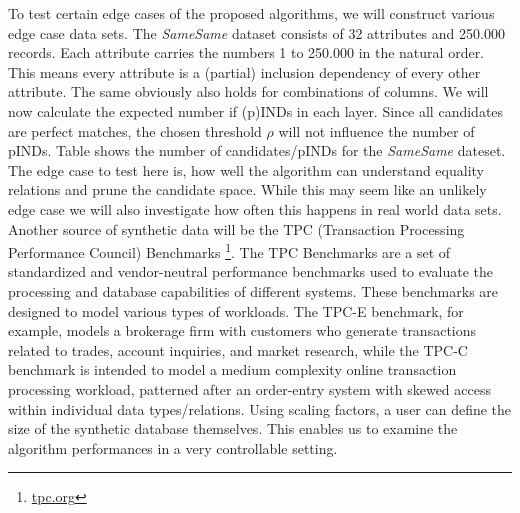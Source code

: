 \noindent To test certain edge cases of the proposed algorithms, we will construct various edge case data sets. The \textit{SameSame} dataset consists of 32 attributes and 250.000 records. Each attribute carries the numbers 1 to 250.000 in the natural order. This means every attribute is a (partial) inclusion dependency of every other attribute. The same obviously also holds for combinations of columns. We will now calculate the expected number if (p)INDs in each layer. Since all candidates are perfect matches, the chosen threshold $\rho$ will not influence the number of pINDs. Table %
shows the number of candidates/pINDs for the \textit{SameSame} dateset.
The edge case to test here is, how well the algorithm can understand equality relations and prune the candidate space. While this may seem like an unlikely edge case we will also investigate how often this happens in real world data sets. \\

\noindent Another source of synthetic data will be the TPC (Transaction Processing Performance Council) Benchmarks \footnote{\href{https://www.tpc.org/}{tpc.org}}. The TPC Benchmarks are a set of standardized and vendor-neutral performance benchmarks used to evaluate the processing and database capabilities of different systems. These benchmarks are designed to model various types of workloads. The TPC-E benchmark, for example, models a brokerage firm with customers who generate transactions related to trades, account inquiries, and market research, while the TPC-C benchmark is intended to model a medium complexity online transaction processing workload, patterned after an order-entry system with skewed access within individual data types/relations. Using scaling factors, a user can define the size of the synthetic database themselves. This enables us to examine the algorithm performances in a very controllable setting.


